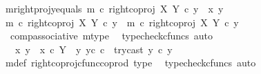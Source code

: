 \begin{isabellebody}
\ m{\isacharunderscore}{\kern0pt}rightproj{\isacharunderscore}{\kern0pt}y{}{\isacharunderscore}{\kern0pt}equals{\isacharcolon}{\kern0pt}\ {\isachardoublequoteopen}m\ {\isasymcirc}\isactrlsub c\ right{\isacharunderscore}{\kern0pt}coproj\ X\ Y\ {\isasymcirc}\isactrlsub c\ y{}\ {\isacharequal}{\kern0pt}\ {\isasymlangle}x{}{\isacharcomma}{\kern0pt}\ y{}{\isasymrangle}{\isachardoublequoteclose}\isanewline
\ \ \ \ \ \ \isamarkupfalse%
\ {\isacharminus}{\kern0pt}\ \isanewline
\ \ \ \ \ \ \ \ \isamarkupfalse%
\ {\isachardoublequoteopen}m\ {\isasymcirc}\isactrlsub c\ right{\isacharunderscore}{\kern0pt}coproj\ X\ Y\ {\isasymcirc}\isactrlsub c\ y{}\ {\isacharequal}{\kern0pt}\ {\isacharparenleft}{\kern0pt}m\ {\isasymcirc}\isactrlsub c\ right{\isacharunderscore}{\kern0pt}coproj\ X\ Y{\isacharparenright}{\kern0pt}\ {\isasymcirc}\isactrlsub c\ y{}{\isachardoublequoteclose}\isanewline
\ \ \ \ \ \ \ \ \ \ \isamarkupfalse%
\ \ comp{\isacharunderscore}{\kern0pt}associative{}\ m{\isacharunderscore}{\kern0pt}type\ \isamarkupfalse%
\ {\isacharparenleft}{\kern0pt}typecheck{\isacharunderscore}{\kern0pt}cfuncs{\isacharcomma}{\kern0pt}\ auto{\isacharparenright}{\kern0pt}\isanewline
\ \ \ \ \ \ \ \ \isamarkupfalse%
\ \isamarkupfalse%
\ {\isachardoublequoteopen}{\isachardot}{\kern0pt}{\isachardot}{\kern0pt}{\isachardot}{\kern0pt}\ {\isacharequal}{\kern0pt}\ {\isacharparenleft}{\kern0pt}{\isacharparenleft}{\kern0pt}{\isasymlangle}x{}{\isacharcomma}{\kern0pt}\ y{}{\isasymrangle}\ {\isasymamalg}\ {\isasymlangle}x{}\ {\isasymcirc}\isactrlsub c\ {\isasymbeta}\isactrlbsub Y\ {\isasymsetminus}\ {\isacharparenleft}{\kern0pt}{\isasymone}{\isacharcomma}{\kern0pt}y{}{\isacharparenright}{\kern0pt}\isactrlesub {\isacharcomma}{\kern0pt}\ y{}\isactrlsup c{\isasymrangle}{\isacharparenright}{\kern0pt}\ {\isasymcirc}\isactrlsub c\ \ try{\isacharunderscore}{\kern0pt}cast\ y{}{\isacharparenright}{\kern0pt}\ {\isasymcirc}\isactrlsub c\ y{}{\isachardoublequoteclose}\isanewline
\ \ \ \ \ \ \ \ \ \ \isamarkupfalse%
\ m{\isacharunderscore}{\kern0pt}def\ right{\isacharunderscore}{\kern0pt}coproj{\isacharunderscore}{\kern0pt}cfunc{\isacharunderscore}{\kern0pt}coprod\ type{}\ \isamarkupfalse%
\ {\isacharparenleft}{\kern0pt}typecheck{\isacharunderscore}{\kern0pt}cfuncs{\isacharcomma}{\kern0pt}\ auto{\isacharparenright}{\kern0pt}\isanewline

\end{isabellebody}

